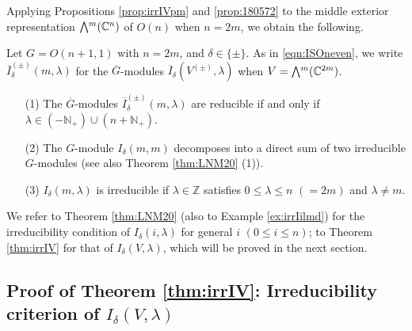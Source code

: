 Applying Propositions \ref{prop:irrIVpm} and \ref{prop:180572}
 to the middle exterior representation
 $\Exterior^m({\mathbb{C}}^{n})$ of $O(n)$
 when $n=2m$, 
 we obtain the following.
\begin{example}
\label{ex:Imm}
Let $G=O(n+1,1)$ with $n=2m$, 
 and $\delta \in \{\pm\}$.  
As in \eqref{eqn:ISOneven}, 
 we write $\overline I_{\delta}^{(\pm)}(m,\lambda)$
 for the $\overline G$-modules
 $\overline I_{\delta}(V^{(\pm)},\lambda)$
 when $V=\Exterior^m({\mathbb{C}}^{2m})$.  
\begin{enumerate}
\item[{\rm{(1)}}]
The $\overline G$-modules
 $\overline I_{\delta}^{(\pm)}(m,\lambda)$ are reducible
 if and only if $\lambda \in (-{\mathbb{N}}_+) \cup (n+{\mathbb{N}}_+)$.  
\item[{\rm{(2)}}]
The $G$-module $I_{\delta}(m,m)$ decomposes
 into a direct sum of two irreducible $G$-modules
 (see also Theorem \ref{thm:LNM20} (1)).  
\item[{\rm{(3)}}]
$I_{\delta}(m,\lambda)$ is irreducible
 if $\lambda \in {\mathbb{Z}}$ 
 satisfies $0 \le \lambda \le n$ $(=2m)$
 and $\lambda \ne m$.  
\end{enumerate}
\end{example}

We refer to Theorem \ref{thm:LNM20}
 (also to Example \ref{ex:irrIilmd})
 for the irreducibility condition
 of $I_{\delta}(i,\lambda)$
 for general $i$ $(0 \le i \le n)$;
to Theorem \ref{thm:irrIV}
 for that of $I_{\delta}(V,\lambda)$, 
 which will be proved in the next section. 



\subsection{Proof of Theorem \ref{thm:irrIV}: 
 Irreducibility criterion of $I_{\delta}(V,\lambda)$}
\label{subsec:pfirrIV}

